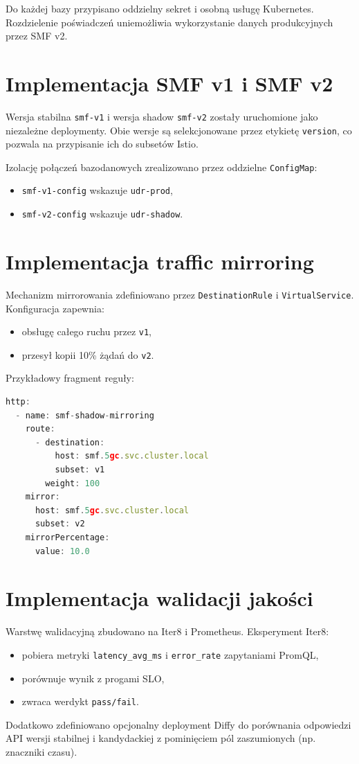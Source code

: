 Do każdej bazy przypisano oddzielny sekret i osobną usługę Kubernetes. Rozdzielenie poświadczeń uniemożliwia wykorzystanie danych produkcyjnych przez SMF v2.

\section{Implementacja SMF v1 i SMF v2}
Wersja stabilna \texttt{smf-v1} i wersja shadow \texttt{smf-v2} zostały uruchomione jako niezależne deploymenty. Obie wersje są selekcjonowane przez etykietę \texttt{version}, co pozwala na przypisanie ich do subsetów Istio.

Izolację połączeń bazodanowych zrealizowano przez oddzielne \texttt{ConfigMap}:
\begin{itemize}
    \item \texttt{smf-v1-config} wskazuje \texttt{udr-prod},
    \item \texttt{smf-v2-config} wskazuje \texttt{udr-shadow}.
\end{itemize}

\section{Implementacja traffic mirroring}
Mechanizm mirrorowania zdefiniowano przez \texttt{DestinationRule} i \texttt{VirtualService}. Konfiguracja zapewnia:
\begin{itemize}
    \item obsługę całego ruchu przez \texttt{v1},
    \item przesył kopii 10\% żądań do \texttt{v2}.
\end{itemize}

Przykładowy fragment reguły:
\begin{lstlisting}[language=JavaScript,style=JavaScriptStyle,caption=Fragment VirtualService z mirrorowaniem,label=lst:vs-mirror]
http:
  - name: smf-shadow-mirroring
    route:
      - destination:
          host: smf.5gc.svc.cluster.local
          subset: v1
        weight: 100
    mirror:
      host: smf.5gc.svc.cluster.local
      subset: v2
    mirrorPercentage:
      value: 10.0
\end{lstlisting}

\section{Implementacja walidacji jakości}
Warstwę walidacyjną zbudowano na Iter8 i Prometheus. Eksperyment Iter8:
\begin{itemize}
    \item pobiera metryki \texttt{latency\_avg\_ms} i \texttt{error\_rate} zapytaniami PromQL,
    \item porównuje wynik z progami SLO,
    \item zwraca werdykt \texttt{pass/fail}.
\end{itemize}

Dodatkowo zdefiniowano opcjonalny deployment Diffy do porównania odpowiedzi API wersji stabilnej i kandydackiej z pominięciem pól zaszumionych (np. znaczniki czasu).


